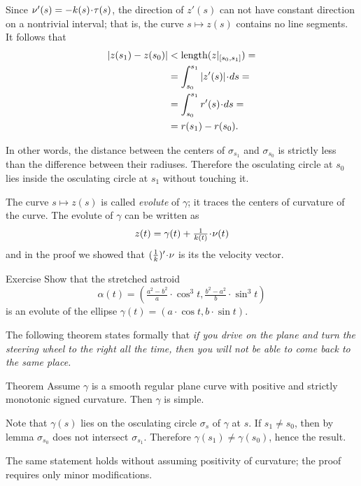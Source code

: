 Since $\nu'(s)=-\skur(s)\cdot\tau(s)$, the direction of $z'(s)$ can not have constant direction on a nontrivial interval;
that is, the curve $s\mapsto z(s)$ contains no line segments.
It follows that 
\begin{align*}
|z(s_1)-z(s_0)|&<\length(z|_{[s_0,s_1]})=
\\
&=\int_{s_0}^{s_1}|z'(s)|\cdot ds=
\\
&=\int_{s_0}^{s_1}r'(s)\cdot ds=
\\
&=r(s_1)-r(s_0).
\end{align*}

In other words, the distance between the centers of $\sigma_{s_1}$ and $\sigma_{s_0}$
is strictly less than the difference between their radiuses.
Therefore the osculating circle at $s_0$ lies inside the osculating circle at $s_1$ without touching it.
\qeds

The curve $s\mapsto z(s)$ is called \emph{evolute} of $\gamma$; 
it traces the centers of curvature of the curve. 
The evolute of $\gamma$ can be written as 
\[z(t)=\gamma(t)+\tfrac1{\kur(t)}\cdot \nu(t)\] and  
in the proof we showed that $(\tfrac1{\kur})'\cdot\nu$ is its the velocity vector.

\begin{thm}{Exercise}\label{ex:evolute-of-ellipse}
Show that the stretched astroid 
\[\alpha(t)=(\tfrac{a^2-b^2}{a}\cdot \cos^3 t,  \tfrac{b^2-a^2}{b}\cdot\sin^3 t)\]
is an evolute of the ellipse $\gamma(t)= (a\cdot \cos t, b\cdot\sin t)$.
\end{thm}



The following theorem states formally that 
\emph{if you drive on the plane and turn the steering wheel to the right all the time,
then you will not be able to come back to the same place.}

\begin{thm}{Theorem}\label{thm:spiral}
Assume $\gamma$ is a smooth regular plane curve with positive and strictly monotonic signed curvature. 
Then $\gamma$ is simple.
\end{thm}

Note that $\gamma(s)$ lies on the osculating circle $\sigma_s$ of $\gamma$ at $s$.
If $s_1\ne s_0$, then by lemma $\sigma_{s_0}$ does not intersect $\sigma_{s_1}$.
Therefore $\gamma(s_1)\ne \gamma(s_0)$,
hence the result.\qeds

The same statement holds without assuming positivity of curvature; the proof requires only minor modifications.

